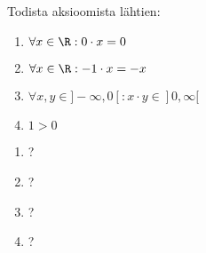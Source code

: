 \begin{tehtava}
Todista aksioomista lähtien:
\begin{enumerate}[(1)]
\item $\forall x \in \R: 0 \cdot x = 0$
\item $\forall x \in \R: -1 \cdot x = -x$
\item $\forall x, y \in ]-\infty,0[: x \cdot y \in ]0,\infty[$
\item $1 > 0$
\end{enumerate}
\begin{vastaus}
\begin{enumerate}[(1)]
    \item ? %
    \item ? %
    \item ? %
    \item ? %
\end{enumerate}
\end{vastaus}
\end{tehtava}
